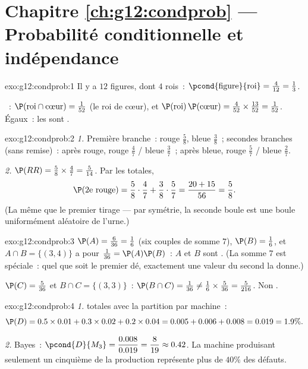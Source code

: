 \section*{Chapitre \ref{ch:g12:condprob} --- Probabilité conditionnelle et indépendance}

\begin{solution}{exo:g12:condprob:1}
Il y a $12$ figures, dont $4$ rois~:
$\pcond{\text{figure}}{\text{roi}} = \frac{4}{12} = \frac13$.

~: $\P(\text{roi} \cap \text{cœur}) = \frac{1}{52}$ (le roi
de cœur), et
$\P(\text{roi})\,\P(\text{cœur}) = \frac{4}{52}\times\frac{13}{52}
= \frac{1}{52}$. Égaux~: les  sont .
\end{solution}

\begin{solution}{exo:g12:condprob:2}
\emph{1.} Première branche~: rouge $\frac58$, bleue $\frac38$~; secondes
branches (sans remise)~: après rouge, rouge $\frac47$ / bleue $\frac37$~;
après bleue, rouge $\frac57$ / bleue $\frac27$.

\emph{2.} $\P(RR) = \frac58 \times \frac47 = \frac{5}{14}$. Par les
 totales,
\[
\P(\text{2e rouge}) = \frac58\cdot\frac47 + \frac38\cdot\frac57
= \frac{20 + 15}{56} = \frac58 .
\]
(La même que le premier tirage --- par symétrie, la seconde boule est une
boule uniformément aléatoire de l'urne.)
\end{solution}

\begin{solution}{exo:g12:condprob:3}
$\P(A) = \frac{6}{36} = \frac16$ (six couples de somme $7$),
$\P(B) = \frac16$, et $A \cap B = \{(3,4)\}$ a pour 
$\frac{1}{36} = \P(A)\P(B)$~: $A$ et $B$ sont . (La somme $7$
est spéciale~: quel que soit le premier dé, exactement une valeur du
second la donne.)

$\P(C) = \frac{5}{36}$ et $B \cap C = \{(3,3)\}$~:
$\P(B \cap C) = \frac{1}{36} \neq \frac16 \times \frac{5}{36}
= \frac{5}{216}$. Non .
\end{solution}

\begin{solution}{exo:g12:condprob:4}
\emph{1.}  totales avec la partition par machine~:
\[
\P(D) = 0.5\times0.01 + 0.3\times0.02 + 0.2\times0.04
= 0.005 + 0.006 + 0.008 = 0.019 = 1.9\% .
\]

\emph{2.} Bayes~:
$\pcond{D}{M_3} = \dfrac{0.008}{0.019} = \dfrac{8}{19} \approx 0.42$. La
machine produisant seulement un cinquième de la production représente plus
de $40\%$ des défauts.
\end{solution}

